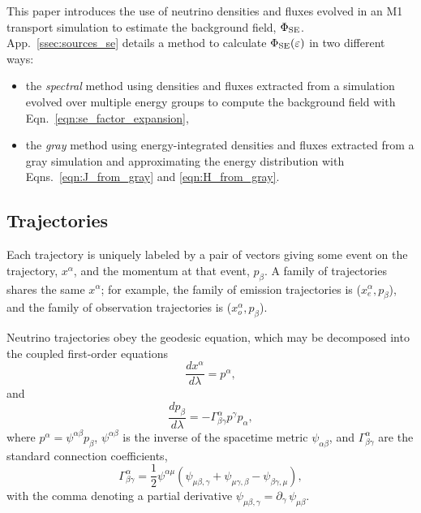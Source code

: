 \documentclass[aps,floatfix,prd,superscriptaddress,twocolumn]{revtex4-1}
\begin{document}
This paper introduces the use of neutrino densities and fluxes evolved in an
M1 transport simulation to estimate the background field, $\Phi_{\rm SE}$.
App.~\ref{ssec:sources_se} details a method to calculate
$\Phi_{\rm SE}(\varepsilon)$ in two different ways:
\begin{itemize}
\item
  the \emph{spectral} method using densities and fluxes
  extracted from a simulation evolved over multiple energy groups
  to compute the background field with Eqn.~\ref{eqn:se_factor_expansion},
\item
  the \emph{gray} method using energy-integrated densities and fluxes
  extracted from a gray simulation and approximating the
  energy distribution with Eqns.~\ref{eqn:J_from_gray} and
  \ref{eqn:H_from_gray}.
\end{itemize}

\subsection{Trajectories}
\label{ssec:trajectories}
Each trajectory is uniquely labeled by a pair of vectors
giving some event on the trajectory, $x^\alpha$,
and the momentum at that event, $p_\beta$.
A family of trajectories shares the same $x^\alpha$; for example,
the family of emission trajectories is ($x^\alpha_e,p_\beta$),
and the family of observation trajectories is ($x^\alpha_o,p_\beta$).

Neutrino trajectories obey the geodesic equation, which may be decomposed into
the coupled first-order equations
\begin{equation}
\label{eqn:geodesic_x}
  \frac{d x^\alpha}{d\lambda} = p^\alpha,
\end{equation}
and
\begin{equation}
\label{eqn:geodesic_p}
  \frac{d p_\beta}{d\lambda} = -\Gamma^\alpha_{\beta\gamma} p^\gamma p_\alpha,
\end{equation}
where $p^\alpha=\psi^{\alpha\beta}p_\beta$,
$\psi^{\alpha\beta}$ is the inverse of the spacetime metric $\psi_{\alpha\beta}$,
and $\Gamma^\alpha_{\beta\gamma}$ are the standard connection coefficients,
\begin{equation}
  \label{eqn:christoffel}
  \Gamma^\alpha_{\beta\gamma} =
  \frac{1}{2} \psi^{\alpha\mu}
  (\psi_{\mu\beta,\gamma} + \psi_{\mu\gamma,\beta} - \psi_{\beta\gamma,\mu}),
\end{equation}
with the comma denoting a partial derivative
$\psi_{\mu\beta,\gamma}=\partial_\gamma\,\psi_{\mu\beta}$.
\end{document}
